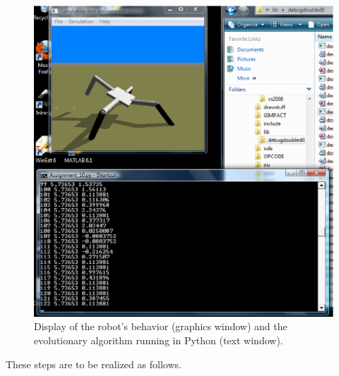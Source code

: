 \documentclass[12pt]{article}
\begin{document}
\begin{figure}
\centerline{
\includegraphics[width=1.0\textwidth]{Fig1}}
\caption{Display of the robot's behavior (graphics window) and the evolutionary algorithm running in Python (text window).}
\label{Fig1}
\end{figure}

These steps are to be realized as follows.
\end{document}
